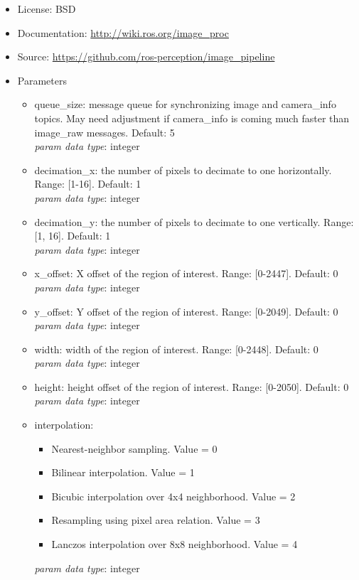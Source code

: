 \begin{itemize}
\item License: BSD
\item Documentation: \url{http://wiki.ros.org/image_proc}
\item Source: \url{https://github.com/ros-perception/image_pipeline}
\item Parameters
\begin{itemize}
\item queue\_size: message queue for synchronizing image and camera\_info topics. May need adjustment if camera\_info is coming much faster than image\_raw messages. Default: 5\\
\textit{param data type}: integer
\item decimation\_x: the number of pixels to decimate to one horizontally. Range: [1-16]. Default: 1\\
\textit{param data type}: integer
\item decimation\_y: the number of pixels to decimate to one vertically. Range: [1, 16]. Default: 1 \\
\textit{param data type}: integer
\item x\_offset: X offset of the region of interest. Range: [0-2447]. Default: 0 \\
\textit{param data type}: integer
\item y\_offset: Y offset of the region of interest. Range: [0-2049]. Default: 0\\
\textit{param data type}: integer
\item width: width of the region of interest. Range: [0-2448]. Default: 0\\
\textit{param data type}: integer
\item height: height offset of the region of interest. Range: [0-2050]. Default: 0\\
\textit{param data type}: integer
\item interpolation:
\begin{itemize}
\item Nearest-neighbor sampling. Value = 0 
\item Bilinear interpolation. Value = 1 
\item Bicubic interpolation over 4x4 neighborhood. Value = 2
\item Resampling using pixel area relation. Value = 3
\item Lanczos interpolation over 8x8 neighborhood. Value = 4
\end{itemize}
\textit{param data type}: integer

\end{itemize}
\end{itemize}
